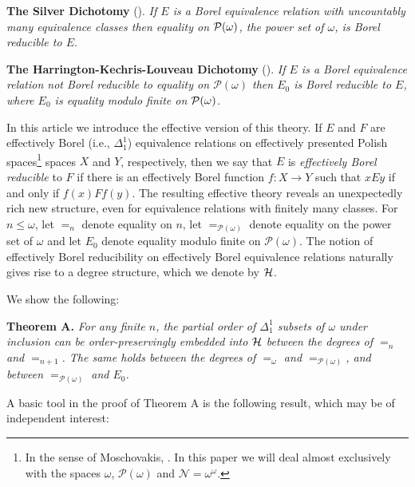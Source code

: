 \documentclass[11pt, english]{article}
\newcommand{\baire}{\mathscr N}
\begin{document}
\medskip

\noindent \textbf{The Silver Dichotomy} (\cite{silver80}). \emph{If
$E$ is a Borel equivalence relation with uncountably many
equivalence classes then equality on ${\cal P}(\omega)$, the power
set of $\omega$, is Borel reducible to $E$}.

\medskip

\noindent \textbf{The Harrington-Kechris-Louveau Dichotomy}
(\cite{hakelou90}). \emph{If $E$ is a Borel equivalence relation not
Borel reducible to equality on ${\mathcal P}(\omega)$ then $E_0$ is
Borel reducible to $E$, where $E_0$ is equality modulo finite on
${\cal P}(\omega)$.}

\medskip

In this article we introduce the effective version of this theory.
If $E$ and $F$ are effectively Borel (i.e., $\Delta^1_1$)
equivalence relations on effectively presented Polish
spaces\footnote{In the sense of Moschovakis,
\cite[3B]{moschovakis80}. In this paper we will deal almost
exclusively with the spaces $\omega$, $\mathcal P(\omega)$ and
$\baire=\omega^\omega$.} spaces $X$ and $Y$, respectively, then we
say that $E$ is \emph{effectively Borel reducible} to $F$ if there
is an effectively Borel function $f:X\to Y$ such that $xEy$ if and
only if $f(x)Ff(y)$. The resulting effective theory reveals an
unexpectedly rich new structure, even for equivalence relations with
finitely many classes. For $n\leq\omega$, let $=_n$ denote equality
on $n$, let $=_{{\mathcal P}(\omega)}$ denote equality on the power
set of $\omega$ and let $E_0$ denote equality modulo finite on
${\mathcal P}(\omega)$. The notion of effectively Borel reducibility
on effectively Borel equivalence relations naturally gives rise to a
degree structure, which we denote by ${\cal H}$.

We show the following:

\medskip

\noindent \textbf{Theorem A.} \emph{For any finite $n$, the partial order of $\Delta^1_1$ subsets of $\omega$ under inclusion can be order-preservingly embedded into $\cal H$ between the degrees of $=_n$ and $=_{n+1}$.
The same holds between the degrees of $=_\omega$ and $=_{{\mathcal P}(\omega)}$, and between
$=_{{\mathcal P}(\omega)}$ and $E_0$.}

\medskip

A basic tool in the proof of Theorem A is the following result,
which may be of independent interest:

\medskip
\end{document}

